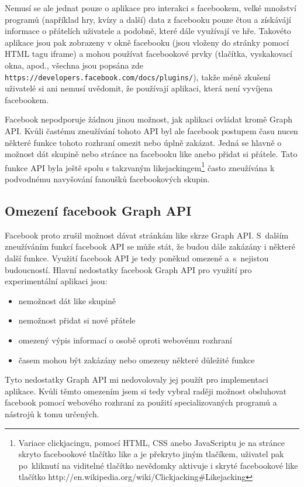 \documentclass[thesis=M,czech]{FITthesis}[2013/05/10]
\begin{document}
Nemusí se ale jednat pouze o aplikace pro interakci s facebookem, velké množství programů (například hry, kvízy a další) data z facebooku pouze čtou a získávájí informace o přátelích uživatele a podobně, které dále využívají ve hře. Takovéto aplikace jsou pak zobrazeny v okně facebooku (jsou vloženy do stránky pomocí HTML tagu iframe) a mohou používat facebookové prvky (tlačítka, vyskakovací okna, apod., všechna jsou popsána zde \verb|https://developers.facebook.com/docs/plugins/|), takže méně zkušení uživatelé si ani nemusí uvědomit, že používají aplikaci, která není vyvíjena facebookem. 

Facebook nepodporuje žádnou jinou možnost, jak aplikaci ovládat kromě Graph API. Kvůli častému zneužívání tohoto API byl ale facebook postupem času nucen některé funkce tohoto rozhraní omezit nebo úplně zakázat. Jedná se hlavně o možnost dát skupině nebo stránce na facebooku like anebo přidat si přátele. Tato funkce API byla ještě spolu s takzvaným likejackingem\footnote{Variace clickjacingu, pomocí HTML, CSS anebo JavaScriptu je na stránce skryto facebookové tlačítko like a je překryto jiným tlačíkem, uživatel pak po~kliknutí na viditelné tlačítko nevědomky aktivuje i skryté facebookové like tlačítko http://en.wikipedia.org/wiki/Clickjacking\#Likejacking} často zneužívána k podvodnému navyšování fanoušků facebookových skupin. 

\subsection{Omezení facebook Graph API}

Facebook proto zrušil možnost dávat stránkám like skrze Graph API. S~dalším zneužíváním funkcí facebook API se může stát, že budou dále zakázány i některé další funkce. Využití facebook API je tedy poněkud omezené a~s~nejistou budoucností. Hlavní nedostatky facebook Graph API pro využití pro experimentální aplikaci jsou:

\begin{itemize}
  \item nemožnost dát like skupině
  \item nemožnost přidat si nové přátele
  \item omezený výpis informací o osobě oproti webovému rozhraní
  \item časem mohou být zakázány nebo omezeny některé důležité funkce
\end{itemize}

Tyto nedostatky Graph API mi nedovolovaly jej použít pro implementaci  aplikace. Kvůli těmto omezením jsem si tedy vybral raději možnost obsluhovat facebook pomocí webového rozhraní za použití specializovaných programů a nástrojů k tomu určených.
\end{document}
